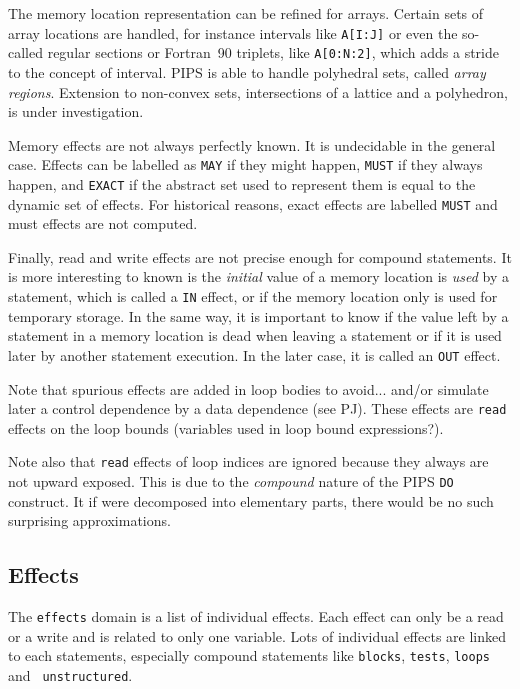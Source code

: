 {The memory location representation can be refined for arrays. Certain
sets of array locations are handled, for instance intervals like
\verb/A[I:J]/ or even the so-called regular sections or Fortran~90
triplets, like \verb/A[0:N:2]/, which adds a stride to the concept of
interval. PIPS is able to handle polyhedral sets, called {\em array
regions}. Extension to non-convex sets, intersections of a lattice and a
polyhedron, is under investigation.

Memory effects are not always perfectly known. It is undecidable in the
general case. Effects can be labelled as {\tt MAY} if they might happen,
{\tt MUST} if they always happen, and {\tt EXACT} if the abstract set
used to represent them is equal to the dynamic set of effects. For
historical reasons, exact effects are labelled {\tt MUST} and must
effects are not computed.

Finally, read and write effects are not precise enough for compound
statements. It is more interesting to known is the {\em initial} value
of a memory location is {\em used} by a statement, which is called a
{\tt IN} effect, or if the memory location only is used for temporary
storage. In the same way, it is important to know if the value left by a
statement in a memory location is dead when leaving a statement or if it
is used later by another statement execution. In the later case, it is
called an {\tt OUT} effect.

Note that spurious effects are added in loop bodies to avoid... and/or
simulate later a control dependence by a data dependence (see
PJ).  These effects are \verb/read/ effects on the loop bounds
(variables used in loop bound expressions?). 

Note also that \verb/read/ effects of loop indices are ignored because
they always are not upward exposed. This is due to the {\em compound}
nature of the PIPS \verb/DO/ construct. It if were decomposed into
elementary parts, there would be no such surprising approximations.

\subsection{Effects}
\label{subsection-effects}

The {\tt effects} domain is a list of individual effects. Each effect
can only be a read or a write and is related to only one variable. Lots
of individual effects are linked to each statements, especially compound
statements like {\tt blocks}, {\tt tests}, {\tt loops} and {\tt
unstructured}.

}
